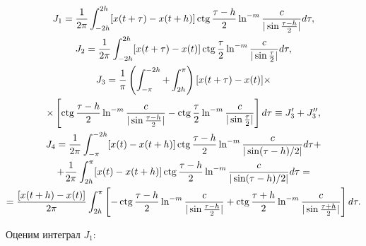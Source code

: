 \begin{gather*}


J_1=


\frac{1}{2 \pi} \int_{- 2h}^{2h} [x(t+\tau)-x(t+h)] \ctg \frac{\tau-h}{2}


\ln^{-m}\frac{c}{|\sin \frac{\tau-h}{2}|} d\tau, \\


%


J_2=


\frac{1}{2 \pi} \int_{- 2h}^{2h} [x(t+\tau)-x(t)] \ctg \frac{\tau}{2}


\ln^{-m}\frac{c}{|\sin \frac{\tau}{2}|} d\tau , \\


%


J_3=\frac{1}{\pi} \left( \int_{-\pi}^{-2h}+


\int_{2h}^{\pi} \right) [x(t+\tau)-x(t)] \times \\


%


\times\left[\ctg\frac{\tau-h}{2}\ln^{-m}\frac{c}{|\sin \frac{\tau-h}{2}|} -


\ctg \frac{\tau}{2} \ln^{-m}\frac{c}{|\sin \frac{\tau}{2}|} \right] d\tau


\equiv J_3' + J_3'', \\


%


J_4 = \frac{1}{2\pi} \int_{-\pi}^{-2h} [x(t) -x(t+h)]


\ctg \frac{\tau-h}{2} \ln^{-m}\frac{c}{|\sin(\tau-h)/2|} d\tau+ \\


%


+\frac{1}{2\pi} \int_{2h}^{\pi} [x(t) -x(t+h)]


\ctg \frac{\tau-h}{2} \ln^{-m}\frac{c}{|\sin(\tau-h)/2|} d\tau= \\


%


=\frac{[x(t+h)-x(t)]}{2\pi}


\int_{2h}^{\pi} \left[- \ctg \frac{\tau-h}{2}


\ln^{-m}\frac{c}{|\sin \frac{\tau-h}{2}|} + \ctg \frac{\tau+h}{2}


\ln^{-m}\frac{c}{|\sin \frac{\tau+h}{2}|} \right] d\tau.


\end{gather*}


Оценим интеграл $J_1$:


